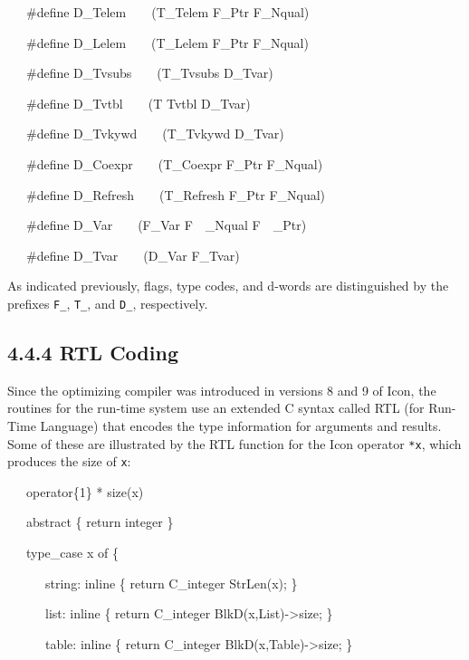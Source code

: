 {\ttfamily\mdseries
\ \ \ \#define D\_Telem\ \ \ \ (T\_Telem {\textbar} F\_Ptr {\textbar} F\_Nqual)}

{\ttfamily\mdseries
\ \ \ \#define D\_Lelem\ \ \ \ (T\_Lelem {\textbar} F\_Ptr {\textbar} F\_Nqual)}

{\ttfamily\mdseries
\ \ \ \#define D\_Tvsubs\ \ \ \ (T\_Tvsubs {\textbar} D\_Tvar)}

{\ttfamily\mdseries
\ \ \ \#define D\_Tvtbl\ \ \ \ (T Tvtbl {\textbar} D\_Tvar)}

{\ttfamily\mdseries
\ \ \ \#define D\_Tvkywd\ \ \ \ (T\_Tvkywd {\textbar} D\_Tvar)}

{\ttfamily\mdseries
\ \ \ \#define D\_Coexpr\ \ \ \ (T\_Coexpr {\textbar} F\_Ptr {\textbar} F\_Nqual)}

{\ttfamily\mdseries
\ \ \ \#define D\_Refresh\ \ \ \ (T\_Refresh {\textbar} F\_Ptr {\textbar} F\_Nqual)}

{\ttfamily\mdseries
\ \ \ \#define D\_Var\ \ \ \ (F\_Var {\textbar} F\ \ \_Nqual {\textbar} F\ \ \_Ptr)}

{\ttfamily\mdseries
\ \ \ \#define D\_Tvar\ \ \ \ (D\_Var {\textbar} F\_Tvar)}

As indicated previously, flags, type codes, and d-words are
distinguished by the prefixes \texttt{F\_}, \texttt{T\_}, and
\texttt{D\_}, respectively.

\subsection[4.4.4 RTL Coding]{4.4.4 RTL Coding}

Since the optimizing compiler was introduced in versions 8 and 9 of
Icon, the routines for the run-time system use an extended C syntax
called RTL (for Run-Time Language) that encodes the type information
for arguments and results. Some of these are illustrated by the RTL
function for the Icon operator \texttt{*x}, which produces the size of
\texttt{x}:

{\ttfamily\mdseries
\ \ \ operator\{1\} * size(x)}

{\ttfamily\mdseries
\ \ \ abstract \{ return integer \}}

{\ttfamily\mdseries
\ \ \ type\_case x of \{}

{\ttfamily\mdseries
\ \ \ \ \ \ string: inline \{ return C\_integer StrLen(x); \}}

{\ttfamily\mdseries
\ \ \ \ \ \ list: inline \{ return C\_integer BlkD(x,List)-{\textgreater}size; \}}

{\ttfamily\mdseries
\ \ \ \ \ \ table: inline \{ return C\_integer BlkD(x,Table)-{\textgreater}size; \}}

